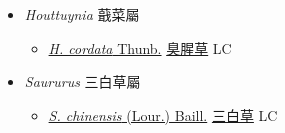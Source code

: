 
  \begin{itemize}
 \item[] \textit{Houttuynia} 蕺菜屬
                    
  \begin{itemize}
        \item[] \href{http://www.theplantlist.org/tpl1.1/search?q=Houttuynia+cordata}{\textit{H. cordata} Thunb.}   \href{\detokenize{http://taibnet.sinica.edu.tw/chi/taibnet_species_list.php?T2=臭腥草&T2_new_value=true&fr=y}}{臭腥草} LC
  \end{itemize}
 \item[] \textit{Saururus} 三白草屬
                    
  \begin{itemize}
        \item[] \href{http://www.theplantlist.org/tpl1.1/search?q=Saururus+chinensis}{\textit{S. chinensis} (Lour.) Baill.}   \href{\detokenize{http://taibnet.sinica.edu.tw/chi/taibnet_species_list.php?T2=三白草&T2_new_value=true&fr=y}}{三白草} LC
  \end{itemize}
  \end{itemize}
